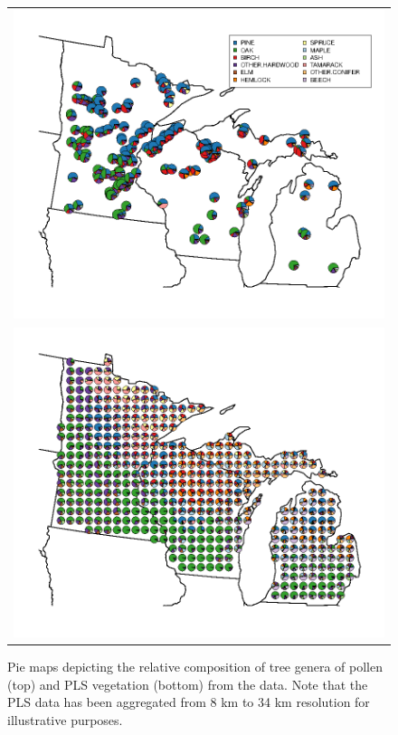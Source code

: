 

\begin{figure}
\centering
\begin{tabular}{c}
\includegraphics[width=5in]{figures/pie_plot_pollen_ALL_v0_3.png} \\
\includegraphics[width=5in]{figures/pie_plot_pls_ALL_v0_3.png}
\end{tabular}
\caption{Pie maps depicting the relative composition of tree genera of pollen (top)
  and PLS vegetation (bottom) from the data. Note that the PLS data
  has been aggregated from 8 km to 34 km resolution for illustrative
  purposes.}
\label{fig:pie}
\end{figure}


